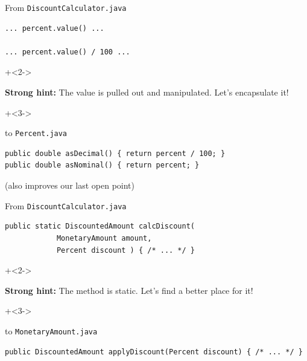 \begin{frame}[fragile]{\de{}}

From \texttt{DiscountCalculator.java}

\begin{lstlisting}
... percent.value() ...

... percent.value() / 100 ...
\end{lstlisting}

\onslide+<2->
\vspace{2em}

\textbf{Strong hint:} The value is pulled out and manipulated. Let's encapsulate it!

\onslide+<3->
\vspace{2em}

to \texttt{Percent.java}

\begin{lstlisting}
public double asDecimal() { return percent / 100; }
public double asNominal() { return percent; }
\end{lstlisting}

(also improves our last open point)

\end{frame}

\begin{frame}[fragile]{\de{}}

From \texttt{DiscountCalculator.java}

\begin{lstlisting}
public static DiscountedAmount calcDiscount(
			MonetaryAmount amount,
			Percent discount ) { /* ... */ }
\end{lstlisting}

\onslide+<2->
\vspace{1.5em}

\textbf{Strong hint:} The method is static. Let's find a better place for it!

\onslide+<3->
\vspace{1.5em}

to \texttt{MonetaryAmount.java}

\begin{lstlisting}
public DiscountedAmount applyDiscount(Percent discount) { /* ... */ }
\end{lstlisting}


\end{frame}




